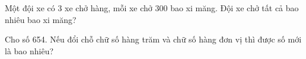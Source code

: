 \begin{ex} %
Một đội xe có 3 xe chở hàng, mỗi xe chở 300 bao xi măng. Đội xe chở tất cả bao nhiêu bao xi măng?
\end{ex}

\begin{ex} %
Cho số 654. Nếu đổi chỗ chữ số hàng trăm và chữ số hàng đơn vị thì được số mới là bao nhiêu?
\end{ex}
